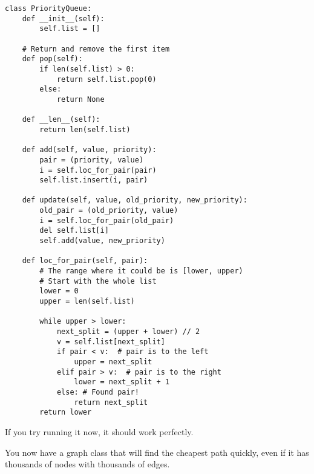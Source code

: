 \begin{verbatim}
class PriorityQueue:
    def __init__(self):
        self.list = []
    
    # Return and remove the first item
    def pop(self):
        if len(self.list) > 0:
            return self.list.pop(0)
        else:
            return None
        
    def __len__(self):
        return len(self.list)
    
    def add(self, value, priority):
        pair = (priority, value)
        i = self.loc_for_pair(pair)
        self.list.insert(i, pair)

    def update(self, value, old_priority, new_priority):
        old_pair = (old_priority, value)
        i = self.loc_for_pair(old_pair)
        del self.list[i]
        self.add(value, new_priority)
    
    def loc_for_pair(self, pair):
        # The range where it could be is [lower, upper)
        # Start with the whole list
        lower = 0
        upper = len(self.list)

        while upper > lower:
            next_split = (upper + lower) // 2
            v = self.list[next_split]    
            if pair < v:  # pair is to the left
                upper = next_split
            elif pair > v:  # pair is to the right
                lower = next_split + 1
            else: # Found pair!
                return next_split
        return lower
\end{verbatim}

If you try running it now, it should work perfectly.

You now have a graph class that will find the cheapest path quickly,
even if it has thousands of nodes with thousands of edges.
